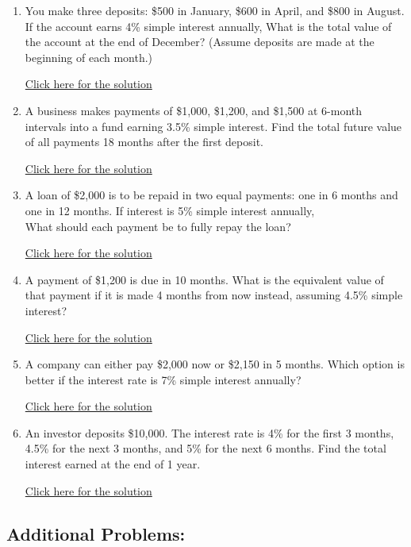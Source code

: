 \documentclass[
]{book}
\providecommand{\tightlist}{%
  \setlength{\itemsep}{0pt}\setlength{\parskip}{0pt}}
\begin{document}
\begin{enumerate}
\def\labelenumi{\arabic{enumi}.}
\tightlist
\item
  You make three deposits: \$500 in January, \$600 in April, and \$800 in August. If the account earns 4\% simple interest annually, What is the total value of the account at the end of December? (Assume deposits are made at the beginning of each month.)

  \href{b}{Click here for the solution}
\item
  A business makes payments of \$1,000, \$1,200, and \$1,500 at 6-month intervals into a fund earning 3.5\% simple interest. Find the total future value of all payments 18 months after the first deposit.

  \href{https://youtu.be/_c-59B-eq24}{Click here for the solution}
\item
  A loan of \$2,000 is to be repaid in two equal payments: one in 6 months and one in 12 months. If interest is 5\% simple interest annually,\\
  What should each payment be to fully repay the loan?

  \href{https://youtu.be/QK3yk1NInE4}{Click here for the solution}
\item
  A payment of \$1,200 is due in 10 months. What is the equivalent value of that payment if it is made 4 months from now instead, assuming 4.5\% simple interest?

  \href{https://youtu.be/Ggslh8jfGrk}{Click here for the solution}
\item
  A company can either pay \$2,000 now or \$2,150 in 5 months. Which option is better if the interest rate is 7\% simple interest annually?

  \href{https://youtu.be/e_qfCFdWR4A}{Click here for the solution}
\item
  An investor deposits \$10,000. The interest rate is 4\% for the first 3 months, 4.5\% for the next 3 months, and 5\% for the next 6 months. Find the total interest earned at the end of 1 year.

  \href{https://youtu.be/PunaGnanvsA}{Click here for the solution}
\end{enumerate}

\subsection*{Additional Problems:}\label{additional-problems-8}
\end{document}
